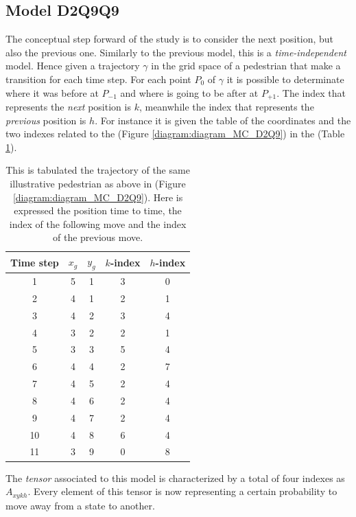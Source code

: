 \documentclass[class=article, crop=false]{standalone}
\begin{document}
\FloatBarrier
\subsection{Model D2Q9Q9}
The conceptual step forward of the study is to consider the next position, but also the previous one.
Similarly to the previous model, this is a \emph{time-independent} model.
Hence given a trajectory $\gamma$ in the grid space of a pedestrian that make a transition for each time step.
For each point $P_0$ of $\gamma$ it is possible to determinate where it was before at $P_{-1}$ and where is going to be after at $P_{+1}$.
The index that represents the \emph{next} position is $k$, meanwhile the index that represents the \emph{previous} position is $h$.
For instance it is given the table of the coordinates and the two indexes related to the (Figure \ref{diagram:diagram_MC_D2Q9}) in the (Table \ref{table:diagram_MC_D2Q9}).
\begin{table}[h!]
\centering
\begin{tabular}{|c|c|c|c|c|}
\hline
Time step & $x_g$ & $y_g$ & $k$-index & $h$-index  \\ \hline
1         & 5 & 1 & 3 & 0 \\ \hline
2         & 4 & 1 & 2 & 1 \\ \hline
3         & 4 & 2 & 3 & 4 \\ \hline
4         & 3 & 2 & 2 & 1 \\ \hline
5         & 3 & 3 & 5 & 4 \\ \hline
6         & 4 & 4 & 2 & 7 \\ \hline
7         & 4 & 5 & 2 & 4 \\ \hline
8         & 4 & 6 & 2 & 4 \\ \hline
9         & 4 & 7 & 2 & 4 \\ \hline
10        & 4 & 8 & 6 & 4 \\ \hline
11        & 3 & 9 & 0 & 8 \\ \hline
\end{tabular}
\captionsetup{width=.6\linewidth}
\caption{This is tabulated the trajectory of the same illustrative pedestrian as above in (Figure \ref{diagram:diagram_MC_D2Q9}).
Here is expressed the position time to time, the index of the following move and the index of the previous move.}
\label{table:diagram_MC_D2Q9}
\end{table}
The \emph{tensor} associated to this model is characterized by a total of four indexes as $A_{x y k h}$.
Every element of this tensor is now representing a certain probability to move away from a state to another.
\end{document}
